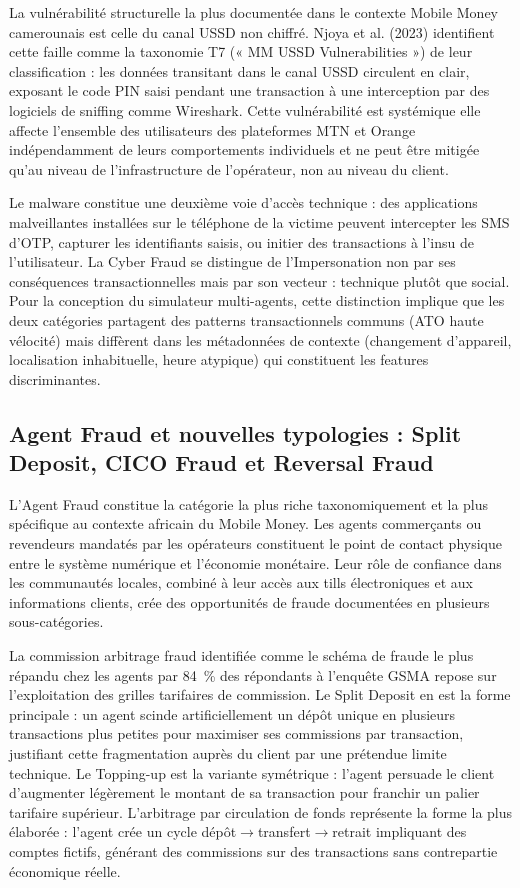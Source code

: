 \documentclass[11pt,a4paper,oneside]{report}
\theoremstyle{definition}
\theoremstyle{remark}
\begin{document}
La vulnérabilité structurelle la plus documentée dans le contexte Mobile Money camerounais est celle du canal USSD non chiffré. Njoya et al. (2023) identifient cette faille comme la taxonomie T7 (« MM USSD Vulnerabilities ») de leur classification : les données transitant dans le canal USSD circulent en clair, exposant le code PIN saisi pendant une transaction à une interception par des logiciels de sniffing comme Wireshark. Cette vulnérabilité est systémique  elle affecte l'ensemble des utilisateurs des plateformes MTN et Orange indépendamment de leurs comportements individuels  et ne peut être mitigée qu'au niveau de l'infrastructure de l'opérateur, non au niveau du client.

Le malware constitue une deuxième voie d'accès technique : des applications malveillantes installées sur le téléphone de la victime peuvent intercepter les SMS d'OTP, capturer les identifiants saisis, ou initier des transactions à l'insu de l'utilisateur. La Cyber Fraud se distingue de l'Impersonation non par ses conséquences transactionnelles mais par son vecteur : technique plutôt que social. Pour la conception du simulateur multi-agents, cette distinction implique que les deux catégories partagent des patterns transactionnels communs (ATO haute vélocité) mais diffèrent dans les métadonnées de contexte (changement d'appareil, localisation inhabituelle, heure atypique) qui constituent les features discriminantes.

\subsection{Agent Fraud et nouvelles typologies : Split Deposit, CICO Fraud et Reversal Fraud}

L'Agent Fraud constitue la catégorie la plus riche taxonomiquement et la plus spécifique au contexte africain du Mobile Money. Les agents  commerçants ou revendeurs mandatés par les opérateurs  constituent le point de contact physique entre le système numérique et l'économie monétaire. Leur rôle de confiance dans les communautés locales, combiné à leur accès aux tills électroniques et aux informations clients, crée des opportunités de fraude documentées en plusieurs sous-catégories.

La commission arbitrage fraud  identifiée comme le schéma de fraude le plus répandu chez les agents par 84~\% des répondants à l'enquête GSMA  repose sur l'exploitation des grilles tarifaires de commission. Le Split Deposit en est la forme principale : un agent scinde artificiellement un dépôt unique en plusieurs transactions plus petites pour maximiser ses commissions par transaction, justifiant cette fragmentation auprès du client par une prétendue limite technique. Le Topping-up est la variante symétrique : l'agent persuade le client d'augmenter légèrement le montant de sa transaction pour franchir un palier tarifaire supérieur. L'arbitrage par circulation de fonds représente la forme la plus élaborée : l'agent crée un cycle dépôt$\rightarrow$transfert$\rightarrow$retrait impliquant des comptes fictifs, générant des commissions sur des transactions sans contrepartie économique réelle.
\end{document}
